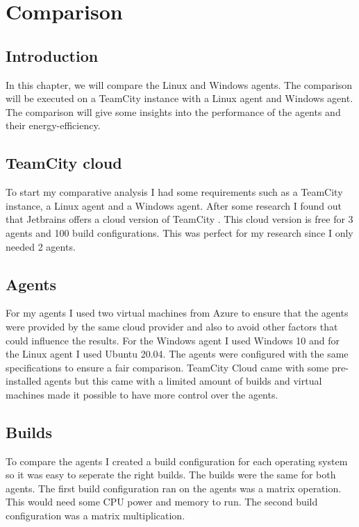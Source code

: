 
\chapter{Comparison}%
\label{ch:comparison}

\section{Introduction}%
\label{sec:introduction-comparison}
In this chapter, we will compare the Linux and Windows agents. The comparison will be executed on a TeamCity instance with a Linux agent and Windows agent. The comparison will give some insights into the performance of the agents and their energy-efficiency.

\section{TeamCity cloud}%
\label{sec:teamcity-cloud}
To start my comparative analysis I had some requirements such as a TeamCity instance, a Linux agent and a Windows agent. After some research I found out that Jetbrains offers a cloud version of TeamCity \autocite{Bevan2021}. This cloud version is free for 3 agents and 100 build configurations. This was perfect for my research since I only needed 2 agents. 

\section{Agents}
For my agents I used two virtual machines from Azure to ensure that the agents were provided by the same cloud provider and also to avoid other factors that could influence the results. For the Windows agent I used Windows 10 and for the Linux agent I used Ubuntu 20.04. The agents were configured with the same specifications to ensure a fair comparison. TeamCity Cloud came with some pre-installed agents but this came with a limited amount of builds and virtual machines made it possible to have more control over the agents.

\section{Builds}
To compare the agents I created a build configuration for each operating system so it was easy to seperate the right builds. The builds were the same for both agents. The first build configuration ran on the agents was a matrix operation. This would need some CPU power and memory to run. The second build configuration was a matrix multiplication. 

